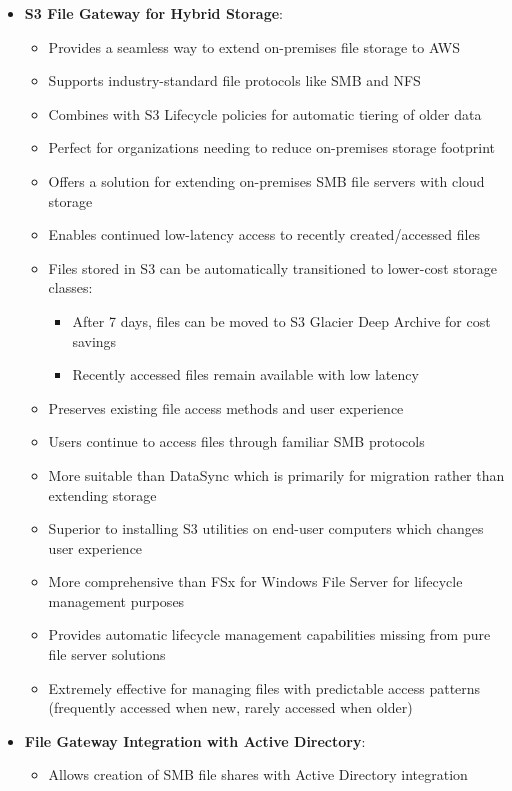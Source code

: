 \documentclass[11pt,a4paper]{report}
\begin{document}
\begin{itemize}
\begin{itemize}
\end{itemize}
  \item \textbf{S3 File Gateway for Hybrid Storage}:
\begin{itemize}
  \item Provides a seamless way to extend on-premises file storage to AWS
  \item Supports industry-standard file protocols like SMB and NFS
  \item Combines with S3 Lifecycle policies for automatic tiering of older data
  \item Perfect for organizations needing to reduce on-premises storage footprint
  \item Offers a solution for extending on-premises SMB file servers with cloud storage
  \item Enables continued low-latency access to recently created/accessed files
  \item Files stored in S3 can be automatically transitioned to lower-cost storage classes:
\begin{itemize}
  \item After 7 days, files can be moved to S3 Glacier Deep Archive for cost savings
  \item Recently accessed files remain available with low latency
\end{itemize}
  \item Preserves existing file access methods and user experience
  \item Users continue to access files through familiar SMB protocols
  \item More suitable than DataSync which is primarily for migration rather than extending storage
  \item Superior to installing S3 utilities on end-user computers which changes user experience
  \item More comprehensive than FSx for Windows File Server for lifecycle management purposes
  \item Provides automatic lifecycle management capabilities missing from pure file server solutions
  \item Extremely effective for managing files with predictable access patterns (frequently accessed when new, rarely accessed when older)
\end{itemize}
  \item \textbf{File Gateway Integration with Active Directory}:
\begin{itemize}
  \item Allows creation of SMB file shares with Active Directory integration

\end{itemize}
\end{itemize}
\end{document}
